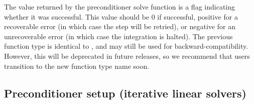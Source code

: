 {
  The value returned by the preconditioner solve function is a flag
  indicating whether it was successful.  This value should be $0$ if successful,
  positive for a recoverable error (in which case the step will be retried), or
  negative for an unrecoverable error (in which case the integration is halted).
}
{
  The previous function type  is identical to
  , and may still be used for backward-compatibility.
  However, this will be deprecated in future releases, so we recommend
  that users transition to the new function type name soon.
}

\subsection{Preconditioner setup (iterative linear solvers)}\label{ss:precondFn}

